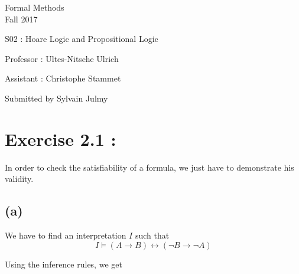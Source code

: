 \documentclass[a4paper,11pt]{report}
\author{Sylvain Julmy}
\date{\today}
\begin{document}
\begin{center}
  \large{
    Formal Methods\\
    Fall 2017
  }
  
  \noindent\makebox[\linewidth]{\rule{\linewidth}{0.4pt}}
  S02 : Hoare Logic and Propositional Logic
  \noindent\makebox[\linewidth]{\rule{\linewidth}{0.4pt}}

  \begin{flushleft}
    Professor : Ultes-Nitsche Ulrich

    Assistant : Christophe Stammet
  \end{flushleft}

  
  \noindent\makebox[\linewidth]{\rule{\linewidth}{0.4pt}}

  Submitted by Sylvain Julmy
  
  \noindent\makebox[\linewidth]{\rule{\textwidth}{1pt}}
\end{center}

\section*{Exercise 2.1 : }

In order to check the satisfiability of a formula, we just have to demonstrate
his validity.

\subsection*{(a)}
We have to find an interpretation $I$ such that 
\[
  I \models (A \to B) \leftrightarrow (\neg B \to \neg A)
\]

Using the inference rules, we get
\end{document}
